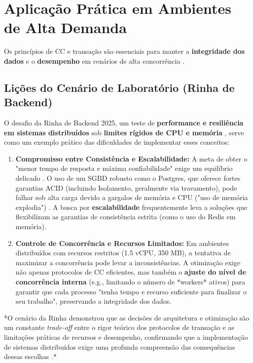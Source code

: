 \documentclass[12pt, a4paper]{article}
\begin{document}
\section{Aplicação Prática em Ambientes de Alta Demanda}

Os princípios de CC e transação são essenciais para manter a \textbf{integridade dos dados} e o \textbf{desempenho} em cenários de alta concorrência \cite{1}.

\subsection{Lições do Cenário de Laboratório (Rinha de Backend)}

O desafio da Rinha de Backend 2025, um teste de \textbf{performance e resiliência em sistemas distribuídos} sob \textbf{limites rígidos de CPU e memória} \cite{1}, serve como um exemplo prático das dificuldades de implementar esses conceitos:

\begin{enumerate}
    \item \textbf{Compromisso entre Consistência e Escalabilidade:} A meta de obter o "menor tempo de resposta e máxima confiabilidade" exige um equilíbrio delicado \cite{1}. O uso de um SGBD robusto como o Postgres, que oferece fortes garantias ACID (incluindo Isolamento, geralmente via travamento), pode falhar sob alta carga devido a gargalos de memória e CPU ("uso de memória explodia") \cite{3}. A busca por \textbf{escalabilidade} frequentemente leva a soluções que flexibilizam as garantias de consistência estrita (como o uso do Redis em memória).
    \item \textbf{Controle de Concorrência e Recursos Limitados:} Em ambientes distribuídos com recursos restritos (1.5 vCPU, 350 MB), a tentativa de maximizar a concorrência pode levar a inconsistências. A otimização exige não apenas protocolos de CC eficientes, mas também o \textbf{ajuste do nível de concorrência interna} (e.g., limitando o número de *workers* ativos) para garantir que cada processo "tenha tempo e recurso suficiente para finalizar o seu trabalho", preservando a integridade dos dados.
\end{enumerate}

\begin{center}
    *O cenário da Rinha demonstrou que as decisões de arquitetura e otimização são um constante \textit{trade-off} entre o rigor teórico dos protocolos de transação e as limitações práticas de recursos e desempenho, confirmando que a implementação de sistemas distribuídos exige uma profunda compreensão das consequências dessas escolhas \cite{1}.*
\end{center}
\end{document}
